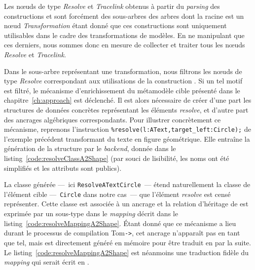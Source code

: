 Les nœuds de type \emph{Resolve} et \emph{Tracelink} obtenus à partir du
\emph{parsing} des constructions  et  sont
forcément des sous-arbres des arbres dont la racine est un nœud
\emph{Transformation} étant donné que ces constructions sont uniquement
utilisables dans le cadre des transformations de modèles. En ne manipulant que
ces derniers, nous sommes donc en mesure de collecter et traiter tous les nœuds
\emph{Resolve} et \emph{Tracelink}.


Dans le sous-arbre représentant une transformation, nous filtrons les nœuds de
type \emph{Resolve} correspondant aux utilisations de la construction
. Si un tel motif est filtré, le mécanisme d'enrichissement du
métamodèle cible présenté dans le chapitre~\ref{ch:approach} est déclenché. Il
est alors nécessaire de créer d'une part les structures de données concrètes
représentant les éléments \emph{resolve}, et d'autre part des ancrages
algébriques correspondants. Pour illustrer concrètement ce mécanisme, reprenons
l'instruction \verb+%resolve(l:AText,target_left:Circle);+ de l'exemple
précédent transformant du texte en figure géométrique. Elle entraîne la
génération de la structure {\java} par le \emph{backend}, donnée dans le
listing~\ref{code:resolveClassA2Shape} (par souci de lisibilité, les noms ont
été simplifiés et les attributs sont publics). 

\begin{figure}[h]
  \begin{center}
    
  \end{center}
\end{figure}

La classe générée ---~ici \texttt{ResolveATextCircle}~--- étend naturellement
la classe de l'élément cible ---~\texttt{Circle} dans notre cas~--- que
l'élément \emph{resolve} est censé représenter. Cette classe est associée à un
ancrage et la relation d'héritage de {\java} est exprimée par un sous-type dans
le \emph{mapping} décrit dans le listing~\ref{code:resolveMappingA2Shape}.
Étant donné que ce mécanisme a lieu durant le processus de compilation
{\textsf{Tom}\texttt{->}\java}, cet ancrage n'apparaît pas en tant que tel, mais
est directement généré en mémoire pour être traduit en {\java} par la suite.
Le listing~\ref{code:resolveMappingA2Shape} est néanmoins une traduction fidèle
du \emph{mapping} qui serait écrit en {\tom}.

